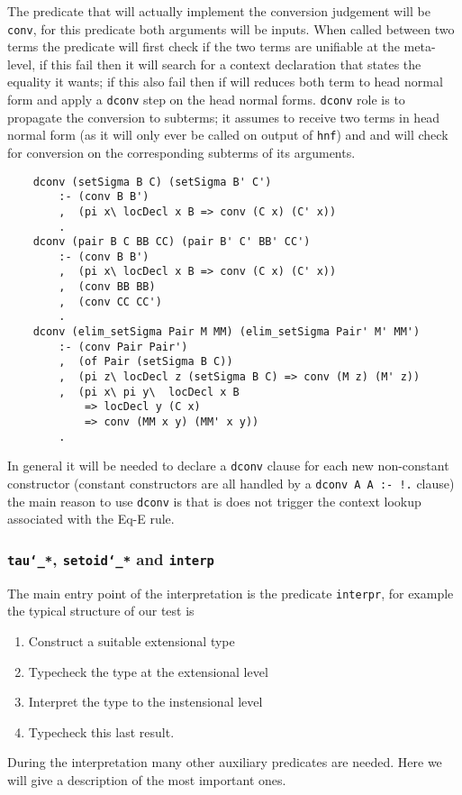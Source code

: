 	The predicate that will actually implement the conversion judgement will be \verb|conv|, for this predicate both arguments will be inputs. When called between two terms the predicate will first check if the two terms are unifiable at the meta-level, if this fail then it will search for a context declaration that states the equality it wants; if this also fail then if will reduces both term to head normal form and apply a \verb|dconv| step on the head normal forms. \verb|dconv| role is to propagate the conversion to subterms; it assumes to receive two terms in head normal form (as it will only ever be called on output of \verb|hnf|) and and will check for conversion on the corresponding subterms of its arguments.
	\begin{verbatim}
	dconv (setSigma B C) (setSigma B' C') 
	    :- (conv B B')
	    ,  (pi x\ locDecl x B => conv (C x) (C' x))
	    .
	dconv (pair B C BB CC) (pair B' C' BB' CC') 
	    :- (conv B B')
	    ,  (pi x\ locDecl x B => conv (C x) (C' x))
	    ,  (conv BB BB)
	    ,  (conv CC CC')
	    .
	dconv (elim_setSigma Pair M MM) (elim_setSigma Pair' M' MM') 
	    :- (conv Pair Pair')
	    ,  (of Pair (setSigma B C))
	    ,  (pi z\ locDecl z (setSigma B C) => conv (M z) (M' z))
	    ,  (pi x\ pi y\  locDecl x B 
	        => locDecl y (C x) 
	        => conv (MM x y) (MM' x y))
	    .
	\end{verbatim}
	In general it will be needed to declare a \verb|dconv| clause for each new non-constant constructor (constant constructors are all handled by a \verb|dconv A A :- !.| clause) the main reason to use \verb|dconv| is that is does not trigger the context lookup associated with the Eq-E rule.
	\subsubsection{\texttt{tau\char`_*}, \texttt{setoid\char`_*} and \texttt{interp}}
	The main entry point of the interpretation is the predicate \verb|interpr|, for example the typical structure of our test is \begin{enumerate}
		\item Construct a suitable extensional type
		\item Typecheck the type at the extensional level
		\item  Interpret the type to the instensional level
		\item Typecheck this last result.
	\end{enumerate}
	During the interpretation many other auxiliary predicates are needed. Here we will give a description of the most important ones.
	
